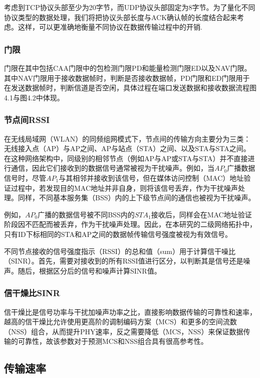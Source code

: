 考虑到TCP协议头部至少为20字节，而UDP协议头部固定为8字节。为了量化不同协议类型的数据处理，我们将把协议头部长度与ACK确认帧的长度结合起来考虑。这样，可以更准确地衡量不同协议在数据传输过程中的开销.

\subsubsection{门限}

门限在其中包括CAA门限中的包检测门限PD和能量检测门限ED以及NAV门限。其中NAV门限用于接收数据帧时，判断是否接收数据帧，PD门限和ED门限用于在发送数据帧时，判断信道是否空闲，具体过程在端口发送数据和接收数据流程图4.1与图4.2中体现。

\subsubsection{节点间RSSI}

在无线局域网（WLAN）的同频组网模式下，节点间的传输方向主要分为三类：无线接入点（AP）与AP之间、AP与站点（STA）之间、以及STA与STA之间。在这种网络架构中，同级别的相邻节点（例如AP与AP或STA与STA）并不直接进行通信，因此它们接收到的数据信号通常被视为干扰噪声。例如，当$AP_0$广播数据信号时，尽管$AP_1$与其相邻并接收到该信号，但在媒体访问控制（MAC）地址验证过程中，若发现目的MAC地址并非自身，则将该信号丢弃，作为干扰噪声处理。同样，不同基本服务集（BSS）内的上下级节点间的通信也被视为干扰噪声。

例如，$AP_0$广播的数据信号被不同BSS内的$STA_1$接收后，同样会在MAC地址验证阶段因不匹配而被丢弃，作为干扰噪声处理。因此，在本研究的二级网络拓扑中，只有ID下标相同的STA和AP之间的数据帧传输信号强度被视为有效信号。

不同节点接收的信号强度指示（RSSI）的总和值（sum）用于计算信干噪比（SINR）。首先，需要对接收到的所有RSSI值进行区分，以判断其是信号还是噪声。随后，根据区分后的信号和噪声计算SINR值。

\subsubsection{信干燥比SINR}

信干燥比是信号功率与干扰加噪声功率之比，直接影响数据传输的可靠性和速率，越高的信干燥比允许使用更高阶的调制编码方案（MCS）和更多的空间流数（NSS）组合，从而提升PHY速率，反之需要降低（MCS，NSS）来保证数据传输的可靠性，故该参数对于预测MCS和NSS组合具有很高参考性。

\subsection{传输速率}

